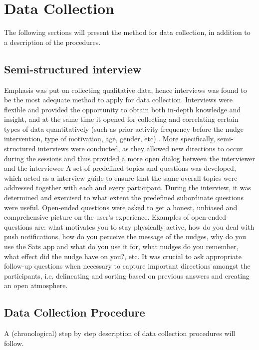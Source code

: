 \section{Data Collection}
The following sections will present the method for data collection, in addition to a description of the procedures. 
    \subsection{Semi-structured interview}
    Emphasis was put on collecting qualitative data, hence interviews was found to be the most adequate method to apply for data collection. Interviews were flexible and provided the opportunity to obtain both in-depth knowledge and insight, and at the same time it opened for collecting and correlating certain types of data quantitatively (such as prior activity frequency before the nudge intervention,  type of motivation, age, gender, etc) \cite{karl_chapter_nodate}. More specifically, semi-structured interviews were conducted, as they allowed new directions to occur during the sessions and thus provided a more open dialog between the interviewer and the interviewee
    A set of predefined topics and questions was developed, which acted as a interview guide to ensure that the same overall topics were addressed together with each and every participant. During the interview, it was determined and exercised to what extent the predefined subordinate questions were useful. 
    Open-ended questions were asked to get a honest, unbiased and comprehensive picture on the user’s experience\cite{lazar_research_2017}. Examples of open-ended questions are: what motivates you to stay physically active, how do you deal with push notifications, how do you perceive the message of the nudges, why do you use the Sats app and what do you use it for, what nudges do you remember, what effect did the nudge have on you?, etc. It was crucial to ask appropriate follow-up questions when necessary to capture important directions amongst the participants, i.e. delineating and sorting based on previous answers and creating an open atmosphere.
 
    \subsection{Data Collection Procedure}
    A (chronological) step by step description of data collection procedures will follow.
    
